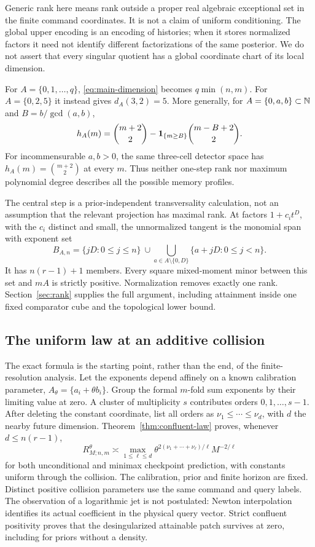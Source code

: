 Generic rank here means rank outside a proper real algebraic exceptional
set in the finite command coordinates. It is not a claim of uniform
conditioning. The global upper encoding is an encoding of histories;
when it stores normalized factors it need not identify different
factorizations of the same posterior. We do not assert that every singular
quotient has a global coordinate chart of its local dimension.

For $A=\{0,1,\ldots,q\}$, \eqref{eq:main-dimension} becomes
$q\min(n,m)$. For $A=\{0,2,5\}$ it instead gives $d_A(3,2)=5$.
More generally, for $A=\{0,a,b\}\subset\mathbb N$ and
$B=b/\gcd(a,b)$,
\begin{equation}\label{eq:three-intro}
 h_A(m)=\binom{m+2}{2}-\mathbf 1_{\{m\ge B\}}\binom{m-B+2}{2}.
\end{equation}
For incommensurable $a,b>0$, the same three-cell detector space has
$h_A(m)=\binom{m+2}{2}$ at every $m$. Thus neither one-step rank nor
maximum polynomial degree describes all the possible memory profiles.

The central step is a prior-independent transversality calculation, not
an assumption that the relevant projection has maximal rank. At factors
$1+c_i t^D$, with the $c_i$ distinct and small, the unnormalized tangent
is the monomial span with exponent set
\[
 B_{A,n}=\{jD:0\le j\le n\}
 \ \cup\!\!\bigcup_{a\in A\setminus\{0,D\}}
                  \{a+jD:0\le j<n\}.
\]
It has $n(r-1)+1$ members. Every square mixed-moment minor between this
set and $mA$ is strictly positive. Normalization removes exactly one rank.
Section~\ref{sec:rank} supplies the full argument, including attainment
inside one fixed comparator cube and the topological lower bound.


\subsection{The uniform law at an additive collision}
The exact formula is the starting point, rather than the end, of the
finite-resolution analysis. Let the exponents depend affinely on a known
calibration parameter, $A_\theta=\{a_i+\theta b_i\}$. Group the
formal $m$-fold sum exponents by their limiting value at zero. A cluster
of multiplicity $s$ contributes orders $0,1,\ldots,s-1$. After deleting
the constant coordinate, list all orders as
$\nu_1\le\cdots\le\nu_d$, with $d$ the nearby future dimension.
Theorem~\ref{thm:confluent-law} proves, whenever $d\le n(r-1)$,
\begin{equation}\label{eq:intro-confluent}
 R_{M;n,m}^\theta\asymp
 \max_{1\le\ell\le d}
       \theta^{2(\nu_1+\cdots+\nu_\ell)/\ell}M^{-2/\ell}
\end{equation}
for both unconditional and minimax checkpoint prediction, with constants
uniform through the collision. The calibration, prior and finite horizon
are fixed. Distinct positive collision parameters use the same command
and query labels. The observation of a logarithmic jet is not postulated:
Newton interpolation identifies its actual coefficient in the physical
query vector. Strict confluent positivity proves that the desingularized
attainable patch survives at zero, including for priors without a density.

